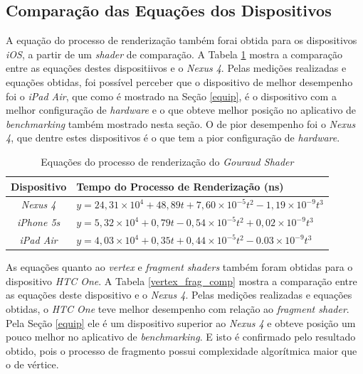 \subsection{Comparação das Equações dos Dispositivos}

	A equação do processo de renderização também forai obtida para os dispositivos \textit{iOS}, a partir de um \textit{shader} de comparação. A Tabela \ref{render_time_comp} mostra a comparação entre as equações destes dispositiivos e o \textit{Nexus 4}. Pelas medições realizadas e equações obtidas, foi possível perceber que o dispositivo de melhor desempenho foi o \textit{iPad Air}, que como é mostrado na Seção \ref{equip}, é o dispositivo com a melhor configuração de \textit{hardware} e o que obteve melhor posição no aplicativo de \textit{benchmarking} também mostrado nesta seção. O de pior desempenho foi o \textit{Nexus 4}, que dentre estes dispositivos é o que tem a pior configuração de \textit{hardware}.

	\begin{table}[ht]
	\centering	
	\begin{tabularx}{0.9\textwidth}{cX}
		\toprule
		\textbf{Dispositivo} & \textbf{Tempo do Processo de Renderização (ns)}  \\
		\midrule
		\textit{Nexus 4} &  $y = 24,31 \times 10^4 + 48,89t + 7,60 \times 10^{-5}t^2 - 1,19 \times 10^{-9}t^3$\\
		\textit{iPhone 5s} &   $y = 5,32 \times 10^4 + 0,79t - 0,54 \times 10^{-5}t^2 + 0,02 \times 10^{-9}t^3$\\
		\textit{iPad Air} & $y = 4,03 \times 10^4 + 0,35t + 0,44 \times 10^{-5}t^2 - 0.03 \times 10^{-9}t^3$\\	
		\bottomrule
	\end{tabularx}
	\caption{Equações do processo de renderização do \textit{Gouraud Shader}}
	\label{render_time_comp}
	\end{table}

	As equações quanto ao \textit{vertex} e \textit{fragment shaders} também foram obtidas para o dispositivo \textit{HTC One}. A Tabela \ref{vertex_frag_comp} mostra a comparação entre as equações deste dispositivo e o \textit{Nexus 4}. Pelas medições realizadas e equações obtidas, o \textit{HTC One} teve melhor desempenho com relação ao \textit{fragment shader}. Pela Seção \ref{equip} ele é um dispositivo superior ao \textit{Nexus 4} e obteve posição um pouco melhor no aplicativo de \textit{benchmarking}.  E isto é confirmado pelo resultado obtido, pois o processo de fragmento possui complexidade algorítmica maior que o de vértice. 

